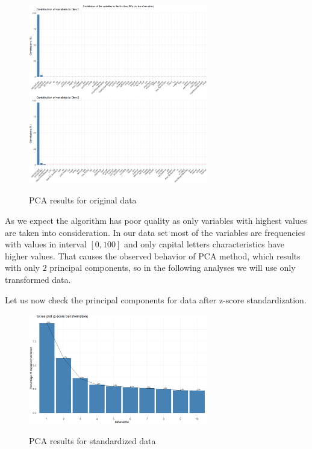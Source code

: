 \documentclass{article}
\begin{document}
	\begin{figure}[h]
		\caption{PCA results for original data}
		\centering
		\includegraphics[width=0.7\textwidth]{"proj2_plots/varplot1.png"}
		\label{fig::varplot}
	\end{figure}
	
	As we expect the algorithm has poor quality as only variables with highest values are taken into consideration. In our data set most of the variables are frequencies with values in interval $[0, 100]$ and only capital letters characteristics have higher values. That causes the observed  behavior of PCA method, which results with only $2$ principal components, so in the following analyses we will use only transformed data.
	
	Let us now check the principal components for data after z-score standardization.
	
	\begin{figure}[h]
		\caption{PCA results for standardized data}
		\centering
		\includegraphics[width=0.7\textwidth]{"proj2_plots/screeplot2.png"}
		\label{fig::screeplot_zscore}
	\end{figure}
	
\end{document}
